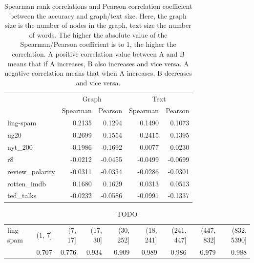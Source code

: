 \begin{table}[htb!]
    \centering
    \begin{tabular}{lrr|rr}
		\toprule
		&  \multicolumn{2}{c}{Graph}&  \multicolumn{2}{c}{Text} \\
        &  Spearman & Pearson &  Spearman & Pearson \\
        \midrule
		ling-spam       &  0.2135 &  0.1294 &  0.1490 &  0.1073 \\
		ng20            &  0.2699 &  0.1554 &  0.2415 &  0.1395 \\
		nyt\_200         & -0.1986 & -0.1692 &  0.0077 &  0.0230 \\
		r8              & -0.0212 & -0.0455 & -0.0499 & -0.0699 \\
		review\_polarity & -0.0311 & -0.0334 & -0.0286 & -0.0301 \\
		rotten\_imdb     &  0.1680 &  0.1629 &  0.0313 &  0.0513 \\
		ted\_talks       & -0.0232 & -0.0586 & -0.0991 & -0.1337 \\
        \bottomrule
    \end{tabular}
    \caption[Table: Graph/text size correlations]{Spearman rank correlations and Pearson correlation coefficient between the accuracy and graph/text size. Here, the graph size is the number of nodes in the graph, text size the number of words. The higher the absolute value of the Spearman/Pearson coefficient is to 1, the higher the correlation.
    A positive correlation value between A and B means that if A increases, B also increases and vice versa.
    A negative correlation means that when A increases, B decreases and vice versa.}%
    \label{table:correlations_size}
\end{table}


\begin{table}[htb!]
	\centering
	\begin{tabular}{lrrrr|rrrr}
		\toprule
		ling-spam &  (1, 7] &  (7, 17] &  (17, 30] &  (30, 252]  & (18, 241] &  (241, 447] &  (447, 832] &  (832, 5390] \\
		 & 0.707 & 0.776 & 0.934 & 0.909 & 0.989 & 0.986 & 0.979 & 0.988 \\
		\bottomrule
	\end{tabular}
\caption[Table: Graph/text size correlations]{TODO}%
\label{table:concept_map_size_binned}
\end{table}

